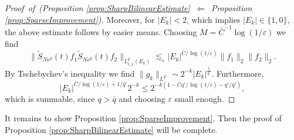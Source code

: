 \documentclass{amsart}
\numberwithin{equation}{section}
\theoremstyle{definition}
\begin{document}
\begin{proof}[Proof~of~(Proposition \ref{prop:SharpBilinearEstimate}~$\Leftarrow$~Proposition \ref{prop:SparseImprovement})]
Moreover, for $|E_k| < 2$, which implies $|E_k| \in \{ 1, 0 \}$, the above estimate follows by easier means. Choosing $M = \bar{C}^{-1} \log(1/\varepsilon)$ we find
\begin{equation*}
\| \tilde{S}_{N \nu^2}(t) f_1 \tilde{S}_{N \nu^2}(t) f_2 \|_{L^{\bar{q}}_{t,x}(E_k)} \lesssim_\varepsilon |E_k|^{\bar{C}/\log(1/\varepsilon)} \| f_1 \|_2 \| f_2 \|_2.
\end{equation*}
By Tschebychev's inequality we find $\| g_k \|_{L^{\bar{q}'}} \sim 2^{-k} |E_k|^{\frac{1}{\bar{q}'}}$. Furthermore,
\begin{equation*}
|E_k|^{\bar{C}/\log(1/\varepsilon) + 1/ \bar{q}'} 2^{-k} \leq 2^{-k ( 1- \bar{C} q'/\log(1/\varepsilon) - q'/\bar{q}')},
\end{equation*}
which is summable, since $q > \bar{q}$ and choosing $\varepsilon$ small enough.
\end{proof} 

It remains to show Proposition \ref{prop:SparseImprovement}. Then the proof of Proposition \ref{prop:SharpBilinearEstimate} will be complete.
\end{document}

